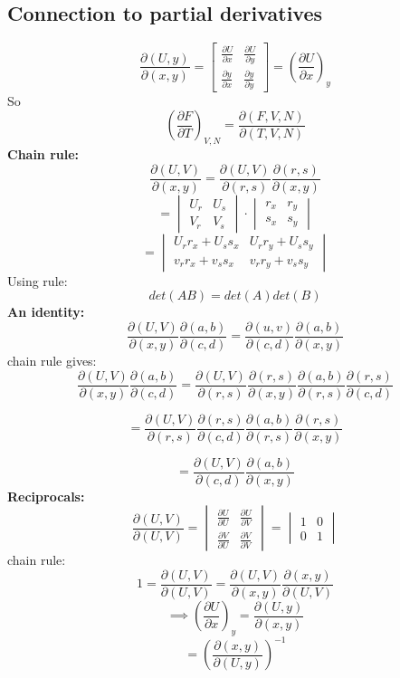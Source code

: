 \documentclass[11pt]{article}
\theoremstyle{definition}
\begin{document}
\subsection{Connection to partial derivatives}
\[ \frac{\partial (U,y)}{\partial (x,y)} = \begin{bmatrix} 
\frac{\partial U}{\partial x} & \frac{\partial U}{\partial y} \\
\frac{\partial y}{\partial x} & \frac{\partial y}{\partial y}
\end{bmatrix}  = \left( \frac{\partial U}{\partial x} \right)_y \] 
 So
 \[ \left( \frac{\partial F}{\partial T} \right)_{V,N} = \frac{\partial (F,V,N)}{\partial (T,V,N)}  \] 
 \textbf{Chain rule:} 
 \[ \frac{\partial (U,V)}{\partial (x,y)} = \frac{\partial (U,V)}{\partial (r,s)} \frac{\partial (r,s)}{\partial (x,y)} \] 
 \[ = \begin{vmatrix}
	 U_r & U_s \\
	 V_r & V_s
 \end{vmatrix} \cdot
\begin{vmatrix}
	r_x & r_y \\
	s_x & s_y
\end{vmatrix}\] 
\[ = \begin{vmatrix}
	U_r r_x + U_s s_x & U_r r_y + U_s s_y \\
	v_r r_x + v_s s_x & v_r r_y + v_s s_y
\end{vmatrix} \] 
 Using rule:
 \[ det(AB) = det(A)det(B) \] 
 \textbf{An identity:} 
 \[ \frac{\partial (U,V)}{\partial (x,y)} \frac{\partial (a,b)}{\partial (c,d)} = \frac{\partial (u,v)}{\partial (c,d)} \frac{\partial (a,b)}{\partial (x,y)} \] 
 chain rule gives:
 \[ \frac{\partial (U,V)}{\partial (x,y)} \frac{\partial (a,b)}{\partial (c,d)} = \frac{\partial (U,V)}{\partial (r,s)} \frac{\partial (r,s)}{\partial (x,y)} \frac{\partial (a,b)}{\partial (r,s)} \frac{\partial (r,s)}{\partial (c,d)} \] 
 
\[ = \frac{\partial (U,V)}{\partial (r,s)} \frac{\partial (r,s)}{\partial (c,d)} \frac{\partial (a,b)}{\partial (r,s)} \frac{\partial (r,s)}{\partial (x,y)} \] 

\[ = \frac{\partial (U,V)}{\partial (c,d)} \frac{\partial (a,b)}{\partial (x,y)} \] 
\textbf{Reciprocals:} 
\[ \frac{\partial (U,V)}{\partial (U,V)} = \begin{vmatrix}
	\frac{\partial U}{\partial U} & \frac{\partial U}{\partial V} \\
	\frac{\partial V}{\partial U} & \frac{\partial V}{\partial V}	
\end{vmatrix} = \begin{vmatrix}
	1 & 0 \\
	0 & 1	
\end{vmatrix}\]
chain rule:
\[ 1 = \frac{\partial (U,V)}{\partial (U,V)} = \frac{\partial (U,V)}{\partial (x,y)} \frac{\partial (x,y)}{\partial (U,V)} \] 
\[ \implies \left( \frac{\partial U}{\partial x} \right)_y = \frac{\partial (U,y)}{\partial (x,y)}  \] 
\[ = \left( \frac{\partial (x,y)}{\partial (U,y)} \right)^{-1}  \] 
\end{document}
